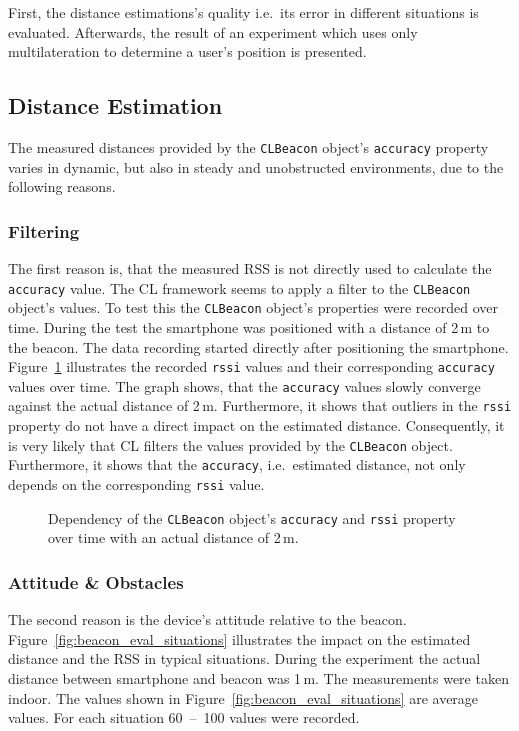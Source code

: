 First, the distance estimations's quality i.e.\ its error in different situations is evaluated. Afterwards, the result of an experiment which uses only multilateration to determine a user's position is presented.

\subsection{Distance Estimation}
The measured distances provided by the \texttt{CLBeacon} object's \texttt{accuracy} property varies in dynamic, but also in steady and unobstructed environments, due to the following reasons.

\subsubsection*{Filtering}
The first reason is, that the measured \ac{RSS} is not directly used to calculate the \texttt{accuracy} value. The \acl{CL} framework seems to apply a filter to the \texttt{CLBeacon} object's values. To test this the \texttt{CLBeacon} object's properties were recorded over time. During the test the smartphone was positioned with a distance of 2\,m to the beacon. The data recording started directly after positioning the smartphone. Figure~\ref{fig:beacon_eval_accuracy-rssi} illustrates the recorded \texttt{rssi} values and their corresponding \texttt{accuracy} values over time. The graph shows, that the \texttt{accuracy} values slowly converge against the actual distance of 2\,m. Furthermore, it shows that outliers in the \texttt{rssi} property do not have a direct impact on the estimated distance. Consequently, it is very likely that \ac{CL} filters the values provided by the \texttt{CLBeacon} object. Furthermore, it shows that the \texttt{accuracy}, i.e.\ estimated distance, not only depends on the corresponding \texttt{rssi} value.

\begin{figure}
	
	\caption {Dependency of the \texttt{CLBeacon} object's \texttt{accuracy} and \texttt{rssi} property over time with an actual distance of 2\,m.}
	\label{fig:beacon_eval_accuracy-rssi}
\end{figure} %

\subsubsection*{Attitude \& Obstacles}
The second reason is the device's attitude relative to the beacon. Figure~\ref{fig:beacon_eval_situations} illustrates the impact on the estimated distance and the \ac{RSS} in typical situations.
During the experiment the actual distance between smartphone and beacon was 1\,m. The measurements were taken indoor. The values shown in Figure~\ref{fig:beacon_eval_situations} are average values. For each situation 60~--~100 values were recorded.\newline

